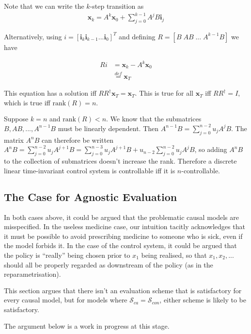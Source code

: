 Note that we can write the $k$-step transition as
\begin{align}
    \mathbf{x}_k = A^k \mathbf{x}_0 + \sum_{j=0}^{k-1} A^j B \mathbf{i}_j
\end{align}

Alternatively, using $i=[\mathbf{i}_k \mathbf{i}_{k-1} ... \mathbf{i}_0]^T$ and defining $R=[B\;AB\; ...\;A^{k-1}B]$ we have

\begin{align}
    Ri &= \mathbf{x}_k - A^k \mathbf{x}_0 \\
       &\overset{def}{=} \mathbf{x}_T
\end{align}

This equation has a solution iff $RR^\dagger \mathbf{x}_T = \mathbf{x}_T$. This is true for all $\mathbf{x}_T$ iff $RR^\dagger = I$, which is true iff $\text{rank}(R)=n$.

Suppose $k=n$ and $\text{rank}(R) < n$. We know that the submatrices $B, AB, ...,A^{n-1}B$ must be linearly dependent. Then $A^{n-1}B = \sum_{j=0}^{n-2} u_j A^j B$. The matrix $A^n B$ can therefore be written $A^n B = \sum_{j=0}^{n-2} u_j A^{j+1} B= \sum_{j=0}^{n-3} u_j A^{j+1} B + u_{n-2} \sum_{j=0}^{n-2} u_j A^j B$, so adding $A^n B$ to the collection of submatrices doesn't increase the rank. Therefore a discrete linear time-invariant control system is controllable iff it is $n$-controllable.

\subsection{The Case for Agnostic Evaluation}

In both cases above, it could be argued that the problematic causal models are misspecified. In the useless medicine case, our intuition tacitly acknowledges that it must be possible to avoid prescribing medicine to someone who is sick, even if the model forbids it. In the case of the control system, it could be argued that the policy is ``really'' being chosen prior to $x_1$ being realised, so that $x_1,x_2,...$ should all be properly regarded as downstream of the policy (as in the reparametrisation). 

This section argues that there isn't an evaluation scheme that is satisfactory for every causal model, but for models where $\mathscr{S}_{ca} = \mathscr{S}_{con}$, either scheme is likely to be satisfactory.

The argument below is a work in progress at this stage.

